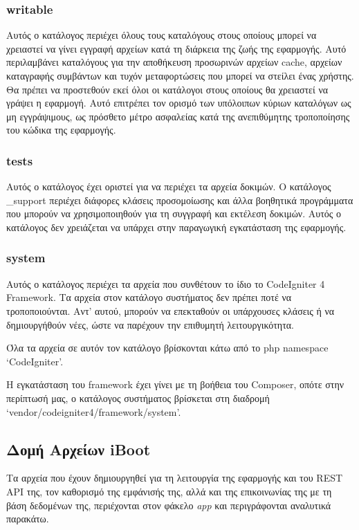 \subsubsection{writable} \label{ui:writable}
Αυτός ο κατάλογος περιέχει όλους τους καταλόγους στους οποίους μπορεί να χρειαστεί να γίνει εγγραφή αρχείων κατά τη διάρκεια της ζωής της εφαρμογής. Αυτό περιλαμβάνει καταλόγους για την αποθήκευση προσωρινών αρχείων cache, αρχείων καταγραφής συμβάντων και τυχόν μεταφορτώσεις που μπορεί να στείλει ένας χρήστης. Θα πρέπει να προστεθούν εκεί όλοι οι κατάλογοι στους οποίους θα χρειαστεί να γράψει η εφαρμογή. Αυτό επιτρέπει τον ορισμό των υπόλοιπων κύριων καταλόγων ως μη εγγράψιμους, ως πρόσθετο μέτρο ασφαλείας κατά της ανεπιθύμητης τροποποίησης του κώδικα της εφαρμογής.

\subsubsection{tests} \label{ui:tests}
Αυτός ο κατάλογος έχει οριστεί για να περιέχει τα αρχεία δοκιμών. Ο κατάλογος \_support περιέχει διάφορες κλάσεις προσομοίωσης και άλλα βοηθητικά προγράμματα που μπορούν να χρησιμοποιηθούν για τη συγγραφή και εκτέλεση δοκιμών. Αυτός ο κατάλογος δεν χρειάζεται να υπάρχει στην παραγωγική εγκατάσταση της εφαρμογής.

\subsubsection{system} \label{ui:system}
Αυτός ο κατάλογος περιέχει τα αρχεία που συνθέτουν το ίδιο το CodeIgniter 4 Framework. Tα αρχεία στον κατάλογο συστήματος δεν πρέπει ποτέ να τροποποιούνται. Αντ' αυτού, μπορούν να επεκταθούν οι υπάρχουσες κλάσεις ή να δημιουργήθούν νέες, ώστε να παρέχουν την επιθυμητή λειτουργικότητα.

Όλα τα αρχεία σε αυτόν τον κατάλογο βρίσκονται κάτω από το php namespace `CodeIgniter'.

Η εγκατάσταση του framework έχει γίνει με τη βοήθεια του Composer, οπότε στην περίπτωσή μας, ο κατάλογος συστήματος βρίσκεται στη διαδρομή `vendor/codeigniter4/framework/system'.

\FloatBarrier
\subsection{Δομή Αρχείων iBoot}
Τα αρχεία που έχουν δημιουργηθεί για τη λειτουργία της εφαρμογής και του REST API της, τον καθορισμό της εμφάνισής της, αλλά και της επικοινωνίας της με τη βάση δεδομένων της, περιέχονται στον φάκελο \emph{app} και περιγράφονται αναλυτικά παρακάτω.

